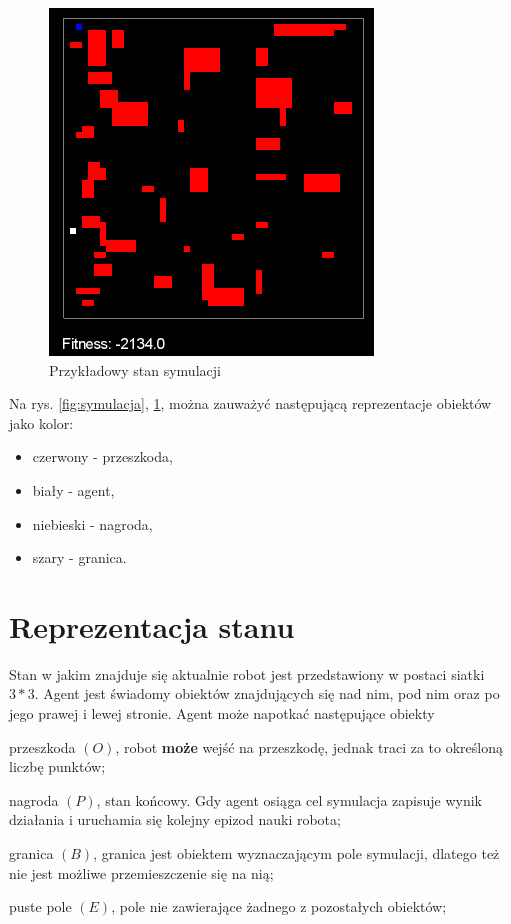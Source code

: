 \begin{figure}[H]
    \centering
    \includegraphics[scale=0.6]{symulacja2}
    \caption{Przykładowy stan symulacji}
    \label{fig:symulacja2}
\end{figure}

Na rys. \ref{fig:symulacja}, \ref{fig:symulacja2}, można zauważyć następującą reprezentacje obiektów jako kolor:
\begin{itemize}
\renewcommand{\labelitemi}{$\bullet$}
 \item czerwony - przeszkoda,
 \item biały - agent,
 \item niebieski - nagroda,
 \item szary - granica.
\end{itemize}


\section{Reprezentacja stanu}
\label{sec:reprezentacjastanu}

Stan w jakim znajduje się aktualnie robot jest przedstawiony w postaci siatki $3*3$. Agent jest świadomy obiektów 
znajdujących się nad nim, pod nim oraz po jego prawej i lewej stronie.
Agent może napotkać następujące obiekty
\begin{description}
 \item przeszkoda $(O)$, robot \textbf{może} wejść na przeszkodę, jednak traci za to określoną liczbę punktów;
 \item nagroda $(P)$, stan końcowy. Gdy agent osiąga cel symulacja zapisuje wynik działania i uruchamia się kolejny 
epizod nauki robota;
 \item granica $(B)$, granica jest obiektem wyznaczającym pole symulacji, dlatego też nie jest możliwe przemieszczenie 
się na nią;
  \item puste pole $(E)$, pole nie zawierające żadnego z pozostałych obiektów;
\end{description}
 
